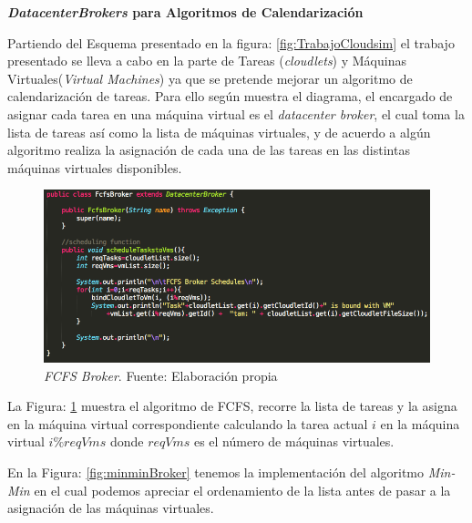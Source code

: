 \newpage


\textbf{\textit{DatacenterBrokers} para Algoritmos de Calendarización}

Partiendo del Esquema presentado en la figura: \ref{fig:TrabajoCloudsim} el trabajo presentado se lleva a cabo en la parte de Tareas (\textit{cloudlets}) y Máquinas Virtuales(\textit{Virtual Machines}) ya que se pretende mejorar un algoritmo de calendarización de tareas.
Para ello según muestra el diagrama, el encargado de asignar cada tarea en una máquina virtual es el \textit{datacenter broker}, el cual toma la lista de tareas así como la lista de máquinas virtuales, y de acuerdo a algún algoritmo realiza la asignación de cada una de las tareas en las distintas máquinas virtuales disponibles.

\renewcommand\thefigure{\arabic{figure}}
\begin{figure}[h!]
	\centering
	\includegraphics[scale=0.4]{media/FCFS_broker}
	\caption{\textit{FCFS Broker}. Fuente: Elaboración propia}
	\label{fig:fcfsBroker}
\end{figure}

La Figura: \ref{fig:fcfsBroker} muestra el algoritmo de FCFS, recorre la lista de tareas y la asigna en la máquina virtual correspondiente calculando la tarea actual $i$ en la máquina virtual $i\%reqVms$ donde $reqVms$ es el número de máquinas virtuales.

\newpage

En la Figura: \ref{fig:minminBroker} tenemos la implementación del algoritmo \textit{Min-Min} en el cual podemos apreciar el ordenamiento de la lista antes de pasar a  la asignación de las máquinas virtuales.


